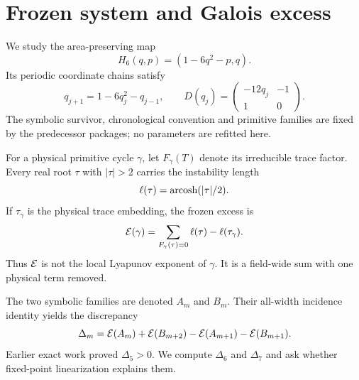 \section{Frozen system and Galois excess}

We study the area-preserving map
\begin{equation}
H_6(q,p)=(1-6q^2-p,q).
\label{eq:henon}
\end{equation}
Its periodic coordinate chains satisfy
\begin{equation}
q_{j+1}=1-6q_j^2-q_{j-1},
\qquad
D(q_j)=\begin{pmatrix}-12q_j&-1\\1&0\end{pmatrix}.
\label{eq:recurrence}
\end{equation}
The symbolic survivor, chronological convention and primitive families are
fixed by the predecessor packages; no parameters are refitted here.

For a physical primitive cycle \(\gamma\), let \(F_\gamma(T)\) denote its
irreducible trace factor.  Every real root \(\tau\) with \(|\tau|>2\) carries
the instability length
\begin{equation}
\ell(\tau)=\operatorname{arcosh}(|\tau|/2).
\end{equation}
If \(\tau_\gamma\) is the physical trace embedding, the frozen excess is
\begin{equation}
\mathcal E(\gamma)
=\sum_{F_\gamma(\tau)=0}\ell(\tau)-\ell(\tau_\gamma).
\label{eq:excess}
\end{equation}
Thus \(\mathcal E\) is not the local Lyapunov exponent of \(\gamma\).  It is a
field-wide sum with one physical term removed.

The two symbolic families are denoted \(A_m\) and \(B_m\).  Their all-width
incidence identity yields the discrepancy
\begin{equation}
\Delta_m=\mathcal E(A_m)+\mathcal E(B_{m+2})
-\mathcal E(A_{m+1})-\mathcal E(B_{m+1}).
\label{eq:delta}
\end{equation}
Earlier exact work proved \(\Delta_5>0\).  We compute \(\Delta_6\) and
\(\Delta_7\) and ask whether fixed-point linearization explains them.
